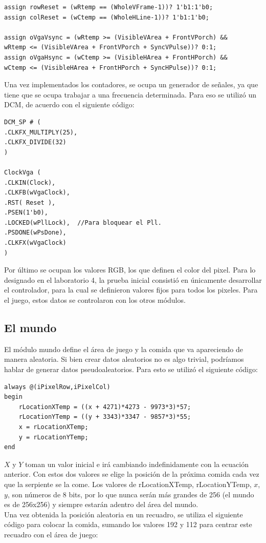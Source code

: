 \documentclass[10pt]{article}
\begin{document}
\begin{lstlisting}
assign rowReset = (wRtemp == (WholeVFrame-1))? 1'b1:1'b0;
assign colReset = (wCtemp == (WholeHLine-1))? 1'b1:1'b0;

assign oVgaVsync = (wRtemp >= (VisibleVArea + FrontVPorch) && 
wRtemp <= (VisibleVArea + FrontVPorch + SyncVPulse))? 0:1;
assign oVgaHsync = (wCtemp >= (VisibleHArea + FrontHPorch) && 
wCtemp <= (VisibleHArea + FrontHPorch + SyncHPulse))? 0:1;
\end{lstlisting}

Una vez implementados los contadores, se ocupa un generador de señales, ya que tiene que se ocupa trabajar a una frecuencia determinada. Para eso se utilizó un DCM, de acuerdo con el siguiente código:

\begin{lstlisting}
DCM_SP # (
.CLKFX_MULTIPLY(25),	
.CLKFX_DIVIDE(32)		
)

ClockVga (
.CLKIN(Clock),			
.CLKFB(wVgaClock), 	
.RST( Reset ),			
.PSEN(1'b0), 			
.LOCKED(wPllLock),	//Para bloquear el Pll.
.PSDONE(wPsDone),	
.CLKFX(wVgaClock)		 
)
\end{lstlisting}

Por último se ocupan los valores RGB, los que definen el color del pixel. Para lo designado en el laboratorio 4, la prueba inicial consistió en únicamente desarrollar el controlador, para la cual se definieron valores fijos para todos los pixeles. Para el juego, estos datos se controlaron con los otros módulos.


\subsection{El mundo}
El módulo mundo define el área de juego y la comida que va apareciendo de manera aleatoria. Si bien crear datos aleatorios no es algo trivial, podríamos hablar de generar datos pseudoaleatorios. Para esto se utilizó el siguiente código:

\begin{lstlisting}
always @(iPixelRow,iPixelCol) 
begin		
	rLocationXTemp = ((x + 4271)*4273 - 9973*3)*57;
	rLocationYTemp = ((y + 3343)*3347 - 9857*3)*55;
	x = rLocationXTemp;
	y = rLocationYTemp;
end
\end{lstlisting}

$X$ y $Y$ toman un valor inicial e irá cambiando indefinidamente con la ecuación anterior. Con estos dos valores se elige la posición de la próxima comida cada vez que la serpiente se la come. Los valores de rLocationXTemp, rLocationYTemp, $x$, $y$, son números de 8 bits, por lo que nunca serán más grandes de 256 (el mundo es de 256x256) y siempre estarán adentro del área del mundo.\\
Una vez obtenida la posición aleatoria en un recuadro, se utiliza el siguiente código para colocar la comida, sumando los valores 192 y 112 para centrar este recuadro con el área de juego:
\end{document}
